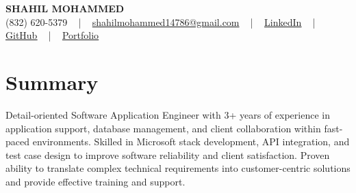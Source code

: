 \documentclass[letterpaper,10pt]{article}
\begin{document}
\begin{center}
    {\fontsize{14pt}{12pt}\selectfont \textbf{\MakeUppercase{Shahil Mohammed}}}\\ \vspace{2pt}
    \fontsize{10pt}{12pt}\selectfont (832) 620-5379 ~ | ~ \href{mailto:shahilmohammed14786@gmail.com}{shahilmohammed14786@gmail.com} ~ | ~  
    \href{https://www.linkedin.com/in/shahil-mohammed-9652931a1/}{\color{blue}\underline{LinkedIn}}  ~ | ~ 
    \href{https://github.com/freakbeast14}{\color{blue}\underline{GitHub}} ~ | ~ 
    \href{https://shahil-mohammed.netlify.app/}{\color{blue}\underline{Portfolio}}
    \vspace{-8pt}
\end{center}

\section{Summary}
\vspace{-2pt}\fontsize{8pt}{9pt}\selectfont
Detail-oriented Software Application Engineer with 3+ years of experience in application support, database management, and client collaboration within fast-paced environments. Skilled in Microsoft stack development, API integration, and test case design to improve software reliability and client satisfaction. Proven ability to translate complex technical requirements into customer-centric solutions and provide effective training and support.
 \vspace{-5pt}
 
\vspace{-2pt}
\end{document}
